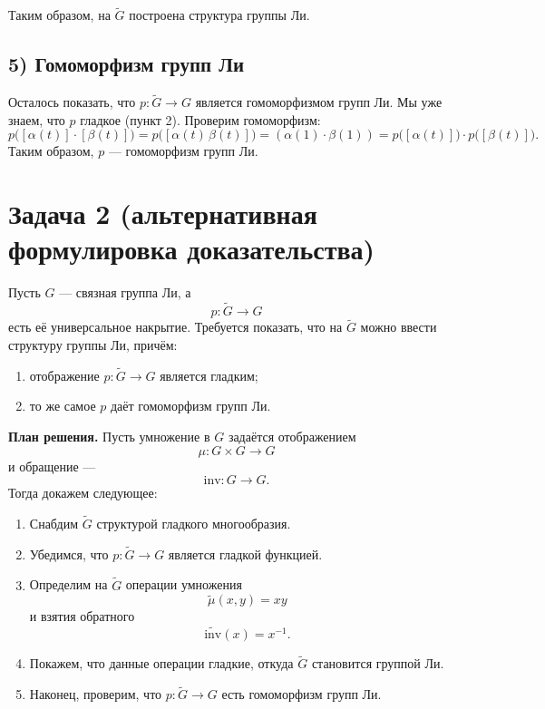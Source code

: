 \documentclass{article}
\begin{document}
Таким образом, на $\widetilde{G}$ построена структура группы Ли.

\subsection*{5) Гомоморфизм групп Ли}
Осталось показать, что $p \colon \widetilde{G} \to G$ является гомоморфизмом групп Ли. Мы уже знаем, что $p$ гладкое (пункт 2). Проверим гомоморфизм:
\[
p\bigl([\alpha(t)] \cdot [\beta(t)]\bigr) = p\bigl([\alpha(t)\,\beta(t)]\bigr)
= (\alpha(1)\cdot \beta(1)) = p\bigl([\alpha(t)]\bigr) \cdot p\bigl([\beta(t)]\bigr).
\]
Таким образом, $p$ --- гомоморфизм групп Ли.



\section*{Задача 2 (альтернативная формулировка доказательства)}

Пусть $G$ --- связная группа Ли, а
\[
p \colon \widetilde{G} \to G
\]
есть её универсальное накрытие. Требуется показать, что на $\widetilde{G}$ можно ввести структуру группы Ли, причём:
\begin{enumerate}
\item отображение $p \colon \widetilde{G} \to G$ является гладким;
\item то же самое $p$ даёт гомоморфизм групп Ли.
\end{enumerate}

\noindent
\textbf{План решения.} Пусть умножение в $G$ задаётся отображением
\[
\mu \colon G \times G \to G
\]
и обращение ---
\[
\mathrm{inv} \colon G \to G.
\]
Тогда докажем следующее:

\begin{enumerate}
\item Снабдим $\widetilde{G}$ структурой гладкого многообразия.
\item Убедимся, что $p \colon \widetilde{G} \to G$ является гладкой функцией.
\item Определим на $\widetilde{G}$ операции умножения
\[
\widetilde{\mu}(x,y) = x y
\]
и взятия обратного
\[
\widetilde{\mathrm{inv}}(x) = x^{-1}.
\]
\item Покажем, что данные операции гладкие, откуда $\widetilde{G}$ становится группой Ли.
\item Наконец, проверим, что $p \colon \widetilde{G} \to G$ есть гомоморфизм групп Ли.
\end{enumerate}
\end{document}
